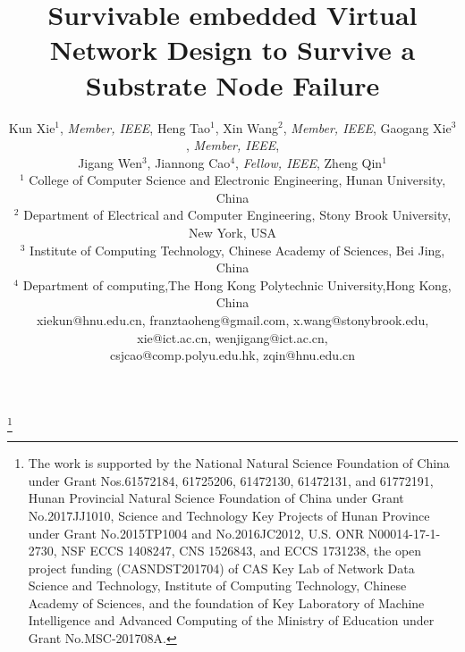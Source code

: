 \documentclass[conference]{IEEEtran}
\begin{document}
\title{Survivable embedded Virtual Network Design to Survive a Substrate Node Failure}
\thanks{The work is supported  by the  National Natural Science Foundation of China under Grant Nos.61572184, 61725206, 61472130, 61472131, and 61772191,  Hunan Provincial Natural Science Foundation of China under Grant No.2017JJ1010,  Science and Technology Key Projects of Hunan Province under Grant No.2015TP1004 and No.2016JC2012,  U.S. ONR N00014-17-1-2730, NSF ECCS 1408247, CNS 1526843, and ECCS 1731238,  the open project funding (CASNDST201704) of CAS Key Lab of Network Data Science and Technology, Institute of Computing Technology, Chinese Academy of Sciences, and the foundation of Key Laboratory of Machine Intelligence and Advanced Computing of the Ministry of Education under Grant No.MSC-201708A.}

\author{Kun Xie$^1$, \emph{Member, IEEE}, Heng Tao$^1$, Xin Wang$^2$, \emph{Member, IEEE}, Gaogang Xie$^3$, \emph{Member, IEEE},\\
Jigang Wen$^3$, Jiannong Cao$^4$, \emph{Fellow, IEEE}, Zheng Qin$^1$\\
$^1$ College of Computer Science and Electronic Engineering, Hunan University, China\\
$^2$ Department of Electrical and Computer Engineering, Stony Brook University, New York, USA\\
$^3$ Institute of Computing Technology, Chinese Academy of Sciences, Bei Jing, China \\
$^4$ Department of computing,The Hong Kong Polytechnic University,Hong Kong, China \\
xiekun@hnu.edu.cn, franztaoheng@gmail.com, x.wang@stonybrook.edu, xie@ict.ac.cn, wenjigang@ict.ac.cn, \\
csjcao@comp.polyu.edu.hk, zqin@hnu.edu.cn}


\maketitle



%



%
%
%
%
%



%





%


\end{document}
